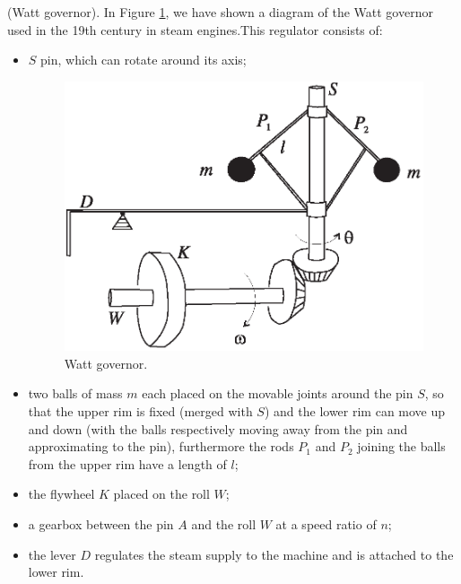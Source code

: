 \begin{example}(Watt governor).
	In Figure \ref{fig:1.5}, we have shown a diagram of the Watt governor used in the 19th century in steam engines.This regulator consists of:
	\begin{itemize}
		\item $S$ pin, which can rotate around its axis;
		\begin{figure}[!ht]
			\centering
			\includegraphics [scale=1.4]{jtr15}
			\caption{Watt governor.}
			\label{fig:1.5}
		\end{figure}
		\item two balls of mass $m$ each placed on the movable joints around the pin $S$, so that the upper rim is fixed (merged with $S$) and the lower rim can move up and down (with the balls respectively moving away from the pin and approximating to the pin), furthermore the rods $P_1$ and $P_2$ joining the balls from the upper rim have a length of $l$;
		\item the flywheel $K$ placed on the roll $W$;
		\item a gearbox between the pin $A$ and the roll $W$ at a speed ratio of $n$;
		\item the lever $D$ regulates the steam supply to the machine and is attached to the lower rim.
	\end{itemize}


\end{example}
